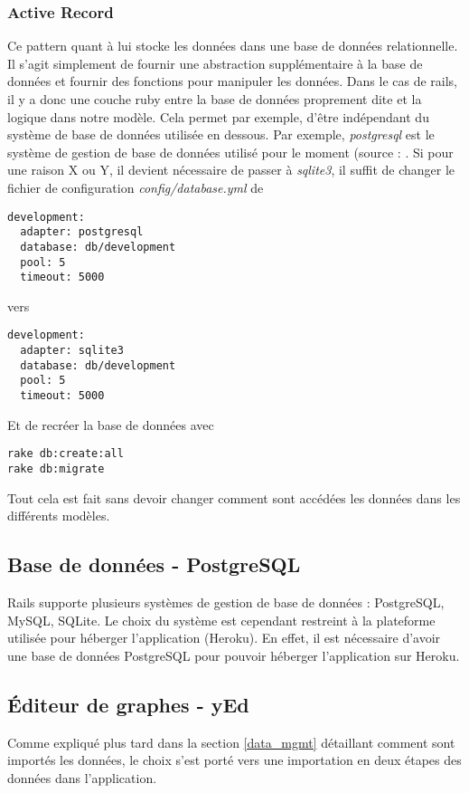 \subsubsection{Active Record}
Ce pattern quant à lui stocke les données dans une base de données relationnelle. Il s'agit simplement de fournir une abstraction supplémentaire à la base de données et fournir des fonctions pour manipuler les données. Dans le cas de rails, il y a donc une couche ruby entre la base de données proprement dite et la logique dans notre modèle. Cela permet par exemple, d'être indépendant du système de base de données utilisée en dessous.  Par exemple, \textit{postgresql} est le système de gestion de base de données utilisé pour le moment (source : \cite{rails_cast_migration_to_postgresql}. Si pour une raison X ou Y, il devient nécessaire de passer à \textit{sqlite3}, il suffit de changer le fichier de configuration \textit{config/database.yml} de
\begin{lstlisting}
development:
  adapter: postgresql
  database: db/development
  pool: 5
  timeout: 5000
\end{lstlisting}
vers
\begin{lstlisting}
development:
  adapter: sqlite3
  database: db/development
  pool: 5
  timeout: 5000
\end{lstlisting}

Et de recréer la base de données avec
\begin{lstlisting}
rake db:create:all
rake db:migrate
\end{lstlisting}



Tout cela est fait sans devoir changer comment sont accédées les données dans les différents modèles.  

\subsection{Base de données - PostgreSQL}

Rails supporte plusieurs systèmes de gestion de base de données : PostgreSQL, MySQL, SQLite. Le choix du système est cependant restreint à la plateforme utilisée pour héberger l'application (Heroku). En effet, il est nécessaire d'avoir une base de données PostgreSQL pour pouvoir héberger l'application sur Heroku. 

\subsection{Éditeur de graphes - yEd}
\label{yed}
Comme expliqué plus tard dans la section \ref{data_mgmt} détaillant comment sont importés les données, le choix s'est porté vers une importation en deux étapes des données dans l'application. 

